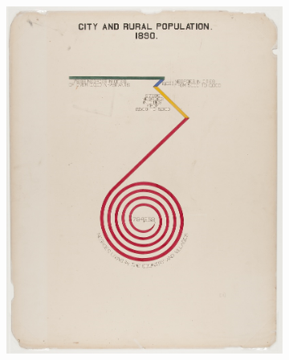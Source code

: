 \documentclass[../main.tex]{subfiles}
\begin{document}
\begin{figure}[H]
    \begin{subfigure}{.24\textwidth}
        \includegraphics[width=1\textwidth]{figures/intro/du_bois_spinny.png}
        \caption{}
        \label{fig:intro_dpa}
    \end{subfigure}
    \begin{subfigure}{.24\textwidth}

\end{subfigure}
\end{figure}
\end{document}
